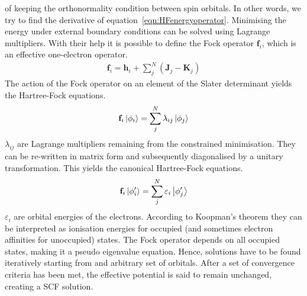 of keeping the orthonormality condition between spin orbitals. In other words,
we try to find the derivative of equation~\eqref{eqn:HFenergyoperator}.
Minimising the energy under external boundary conditions can be solved using
Lagrange multipliers. With their help it is possible to define the Fock
operator $\mathbf{f}_i$, which is an effective one-electron operator.
%
\begin{align}
    \mathbf{f}_i=\mathbf{h}_i + \sum_j^N\left( \mathbf{J}_j - \mathbf{K}_j \right)
\end{align}
%
The action of the Fock operator on an element of the Slater determinant yields
the Hartree-Fock equations.
%
\begin{align}
    \mathbf{f}_i\ket{\phi_i}=\sum_j^N\lambda_{ij}\ket{\phi_j}\label{eqn:HFequations}
\end{align}
%
$\lambda_{ij}$ are Lagrange multipliers remaining from the constrained
minimisation. They can be re-written in matrix form and subsequently
diagonalised by a unitary transformation. This yields the canonical
Hartree-Fock equations.
%
\begin{align}
    \mathbf{f}_i\ket{\phi'_i}=\sum_j^N\varepsilon_i\ket{\phi'_j}\label{eqn:HFequationscanonical}
\end{align}
%
$\varepsilon_i$ are orbital energies of the electrons. According to Koopman's
theorem they can be interpreted as ionisation energies for occupied (and
sometimes electron affinities for unoccupied) states. The Fock operator depends on all
occupied states, making it a pseudo eigenvalue equation. Hence, solutions have
to be found iteratively starting from and arbitrary set of orbitals. After a
set of convergence criteria has been met, the effective potential is said to
remain unchanged, creating a \ac{SCF} solution.  \\ 

